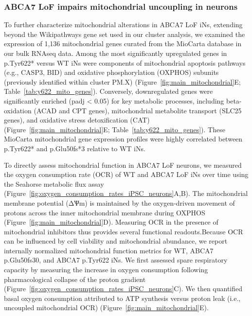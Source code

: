 \subsubsection{ABCA7 LoF impairs mitochondrial uncoupling in neurons}
To further characterize mitochondrial alterations in ABCA7 LoF iNs, extending beyond the Wikipathways gene set used in our cluster analysis, we examined the expression of 1,136 mitochondrial genes curated from the MioCarta database in our bulk RNAseq data. Among the most significantly upregulated genes in p.Tyr622* versus WT iNs were components of mitochondrial apoptosis pathways (e.g., CASP3, BID) and oxidative phosphorylation (OXPHOS) subunits (previously identified within cluster PM.X) (Figure~\ref{fig:main_mitochondrial}E; Table~\ref{tab:y622_mito_genes}). Conversely, downregulated genes were significantly enriched (padj < 0.05) for key metabolic processes, including beta-oxidation (ACAD and CPT genes), mitochondrial metabolite transport (SLC25 genes), and oxidative stress detoxification (CAT) (Figure~\ref{fig:main_mitochondrial}E; Table~\ref{tab:y622_mito_genes}). These MioCarta mitochondrial gene expression profiles were highly correlated between p.Tyr622* and p.Glu50fs*3 relative to WT iNs.

To directly assess mitochondrial function in ABCA7 LoF neurons, we measured the oxygen consumption rate (OCR) of WT and ABCA7 LoF iNs over time using the Seahorse metabolic flux assay (Figure~\ref{fig:oxygen_consumption_rates_iPSC_neurons}A,B). The mitochondrial membrane potential (ΔѰm) is maintained by the oxygen-driven movement of protons across the inner mitochondrial membrane during OXPHOS (Figure~\ref{fig:main_mitochondrial}D). Measuring OCR in the presence of mitochondrial inhibitors thus provides several functional readouts.Because OCR can be influenced by cell viability and mitochondrial abundance\cite{Divakaruni2014-eq,Gu2021-ms}, we report internally normalized mitochondrial function metrics\cite{Divakaruni2022-rj} for WT, ABCA7 p.Glu50fs30, and ABCA7 p.Tyr622 iNs. We first assessed spare respiratory capacity by measuring the increase in oxygen consumption following pharmacological collapse of the proton gradient\cite{Divakaruni2022-rj} (Figure~\ref{fig:oxygen_consumption_rates_iPSC_neurons}C). We then quantified basal oxygen consumption attributed to ATP synthesis versus proton leak (i.e., uncoupled mitochondrial OCR)\cite{Divakaruni2014-eq} (Figure~\ref{fig:main_mitochondrial}E).

